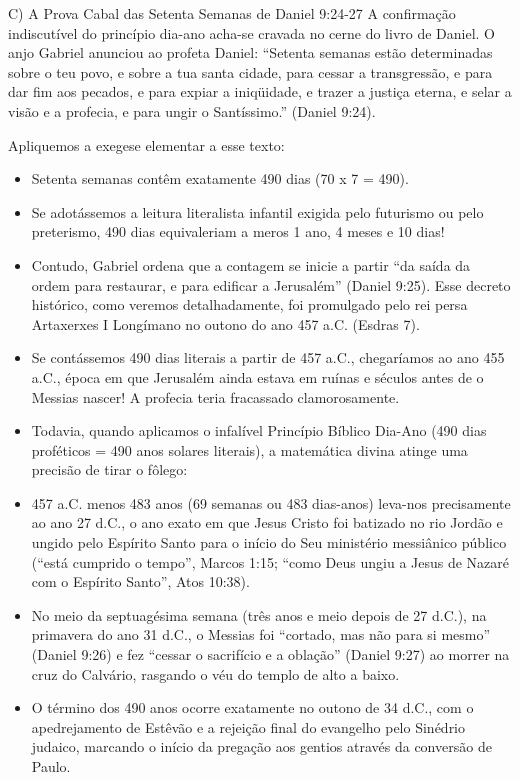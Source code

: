 C) A Prova Cabal das Setenta Semanas de Daniel 9:24-27
A confirmação indiscutível do princípio dia-ano acha-se cravada no cerne do livro de Daniel. O anjo Gabriel anunciou ao profeta Daniel:
``Setenta semanas estão determinadas sobre o teu povo, e sobre a tua santa cidade, para cessar a transgressão, e para dar fim aos pecados, e para expiar a iniqüidade, e trazer a justiça eterna, e selar a visão e a profecia, e para ungir o Santíssimo.'' (Daniel 9:24).

Apliquemos a exegese elementar a esse texto:
\begin{itemize}
  \item Setenta semanas contêm exatamente 490 dias (70 x 7 = 490).
  \item Se adotássemos a leitura literalista infantil exigida pelo futurismo ou pelo preterismo, 490 dias equivaleriam a meros 1 ano, 4 meses e 10 dias!
  \item Contudo, Gabriel ordena que a contagem se inicie a partir ``da saída da ordem para restaurar, e para edificar a Jerusalém'' (Daniel 9:25). Esse decreto histórico, como veremos detalhadamente, foi promulgado pelo rei persa Artaxerxes I Longímano no outono do ano 457 a.C. (Esdras 7).
  \item Se contássemos 490 dias literais a partir de 457 a.C., chegaríamos ao ano 455 a.C., época em que Jerusalém ainda estava em ruínas e séculos antes de o Messias nascer! A profecia teria fracassado clamorosamente.
  \item Todavia, quando aplicamos o infalível Princípio Bíblico Dia-Ano (490 dias proféticos = 490 anos solares literais), a matemática divina atinge uma precisão de tirar o fôlego:
  \item 457 a.C. menos 483 anos (69 semanas ou 483 dias-anos) leva-nos precisamente ao ano 27 d.C., o ano exato em que Jesus Cristo foi batizado no rio Jordão e ungido pelo Espírito Santo para o início do Seu ministério messiânico público (``está cumprido o tempo'', Marcos 1:15; ``como Deus ungiu a Jesus de Nazaré com o Espírito Santo'', Atos 10:38).
  \item No meio da septuagésima semana (três anos e meio depois de 27 d.C.), na primavera do ano 31 d.C., o Messias foi ``cortado, mas não para si mesmo'' (Daniel 9:26) e fez ``cessar o sacrifício e a oblação'' (Daniel 9:27) ao morrer na cruz do Calvário, rasgando o véu do templo de alto a baixo.
  \item O término dos 490 anos ocorre exatamente no outono de 34 d.C., com o apedrejamento de Estêvão e a rejeição final do evangelho pelo Sinédrio judaico, marcando o início da pregação aos gentios através da conversão de Paulo.
\end{itemize}


